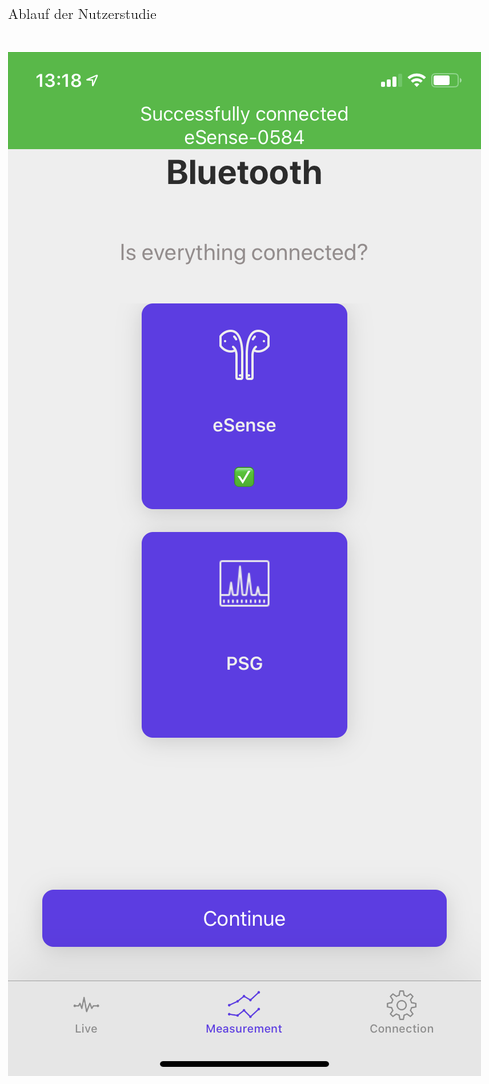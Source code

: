 \documentclass[18pt]{beamer}
\begin{document}
\begin{frame}{Ablauf der Nutzerstudie}
    \begin{center}
        \begin{columns}[T] %
            \begin{column}{.33\textwidth}
                \centering
                \includegraphics[scale=0.1]{images/app/connect_success.PNG}

\end{column}
\end{columns}
\end{center}
\end{frame}
\end{document}
